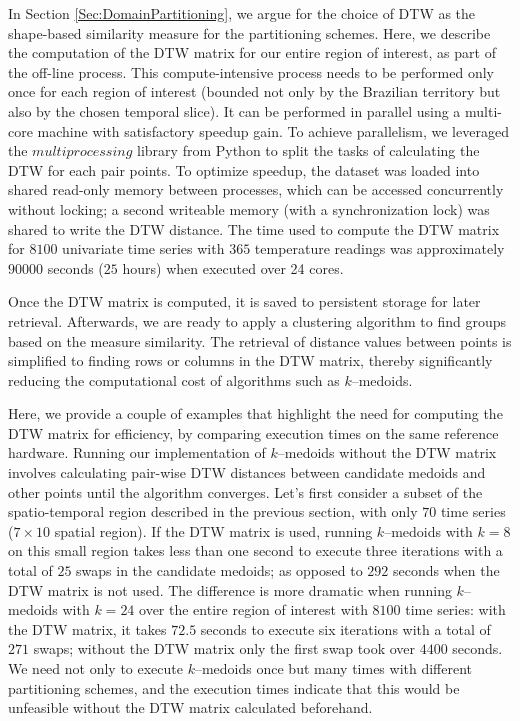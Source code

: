 In Section \ref{Sec:DomainPartitioning}, we argue for the choice of DTW as the shape-based similarity measure for the partitioning schemes. Here, we describe the computation of the DTW matrix for our entire region of interest, as part of the off-line process. This compute-intensive process needs to be performed only once for each region of interest (bounded not only by the Brazilian territory but also by the chosen temporal slice). It can be performed in parallel using a multi-core machine with satisfactory speedup gain. To achieve parallelism, we leveraged the $multiprocessing$ library from Python to split the tasks of calculating the DTW for each pair points. To optimize speedup, the dataset was loaded into shared read-only memory between processes, which can be accessed concurrently without locking; a second writeable memory (with a synchronization lock) was shared to write the DTW distance. The time used to compute the DTW matrix for $8100$ univariate time series with $365$ temperature readings was approximately $90000$ seconds ($25$ hours) when executed over 24 cores.

Once the DTW matrix is computed, it is saved to persistent storage for later retrieval. Afterwards, we are ready to apply a clustering algorithm to find groups based on the measure similarity. The retrieval of distance values between points is simplified to finding rows or columns in the DTW matrix, thereby significantly reducing the computational cost of algorithms such as $k$--medoids.

Here, we provide a couple of examples that highlight the need for computing the DTW matrix for efficiency, by comparing execution times on the same reference hardware. Running our implementation of $k$--medoids without the DTW matrix involves calculating pair-wise DTW distances between candidate medoids and other points until the algorithm converges. Let's first consider a subset of the spatio-temporal region described in the previous section, with only $70$ time series ($7 \times 10$ spatial region). If the DTW matrix is used, running $k$--medoids with $k=8$ on this small region takes less than one second to execute three iterations with a total of $25$ swaps in the candidate medoids; as opposed to $292$ seconds when the DTW matrix is not used. The difference is more dramatic when running $k$--medoids with $k=24$ over the entire region of interest with $8100$ time series: with the DTW matrix, it  takes $72.5$ seconds to execute six iterations with a total of $271$ swaps; without the DTW matrix only the first swap took over $4400$ seconds. We need not only to execute $k$--medoids once but many times with different partitioning schemes, and the execution times indicate that this would be unfeasible without the DTW matrix calculated beforehand.

